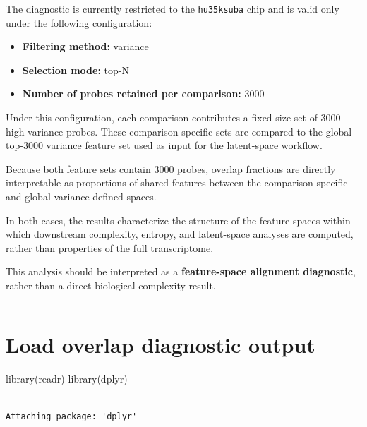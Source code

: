\documentclass[
  letterpaper,
  DIV=11,
  numbers=noendperiod,
  openany,
  oneside]{scrreprt}
\newenvironment{Shaded}{\begin{snugshade}}{\end{snugshade}}
\newcommand{\FunctionTok}[1]{\textcolor[rgb]{0.28,0.35,0.67}{#1}}
\newcommand{\NormalTok}[1]{\textcolor[rgb]{0.00,0.23,0.31}{#1}}
\providecommand{\tightlist}{%
  \setlength{\itemsep}{0pt}\setlength{\parskip}{0pt}}
\begin{document}
The diagnostic is currently restricted to the \texttt{hu35ksuba} chip
and is valid only under the following configuration:

\begin{itemize}
\tightlist
\item
  \textbf{Filtering method:} variance\\
\item
  \textbf{Selection mode:} top-N\\
\item
  \textbf{Number of probes retained per comparison:} 3000
\end{itemize}

Under this configuration, each comparison contributes a fixed-size set
of 3000 high-variance probes. These comparison-specific sets are
compared to the global top-3000 variance feature set used as input for
the latent-space workflow.

Because both feature sets contain 3000 probes, overlap fractions are
directly interpretable as proportions of shared features between the
comparison-specific and global variance-defined spaces.

In both cases, the results characterize the structure of the feature
spaces within which downstream complexity, entropy, and latent-space
analyses are computed, rather than properties of the full transcriptome.

This analysis should be interpreted as a \textbf{feature-space alignment
diagnostic}, rather than a direct biological complexity result.

\begin{center}\rule{0.5\linewidth}{0.5pt}\end{center}

\section{Load overlap diagnostic
output}\label{load-overlap-diagnostic-output}

\begin{Shaded}
\begin{Highlighting}[]
\FunctionTok{library}\NormalTok{(readr)}
\FunctionTok{library}\NormalTok{(dplyr)}
\end{Highlighting}
\end{Shaded}

\begin{verbatim}

Attaching package: 'dplyr'
\end{verbatim}
\end{document}
